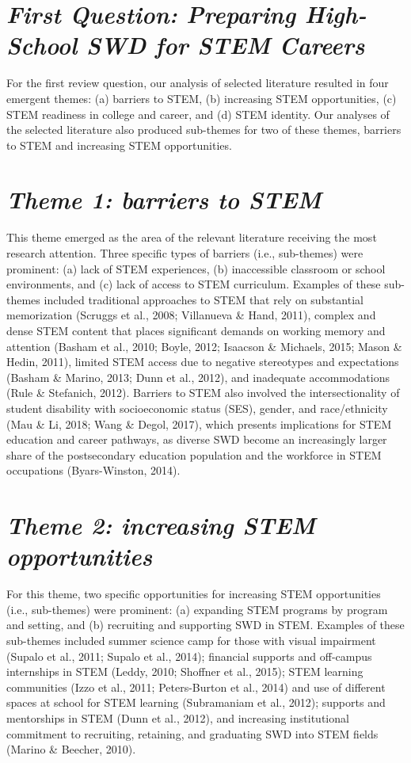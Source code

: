 \documentclass[11pt]{sig-alternate}
\begin{document}
\begin{large}
\section*{\textit{First Question: Preparing High-School SWD for STEM Careers}}
 
For the first review question, our analysis of selected literature resulted in four emergent themes: (a) barriers to STEM, (b) increasing STEM opportunities, (c) STEM readiness in college and career, and (d) STEM identity. Our analyses of the selected literature also produced sub-themes for two of these themes, barriers to STEM and increasing STEM opportunities.   

\section*{\textit{Theme 1: barriers to STEM}}

This theme emerged as the area of the relevant literature receiving the most research attention. Three specific types of barriers (i.e., sub-themes) were prominent: (a) lack of STEM experiences, (b) inaccessible classroom or school environments, and (c) lack of access to STEM curriculum. Examples of these sub-themes included traditional approaches to STEM that rely on substantial memorization (Scruggs et al., 2008; Villanueva \& Hand, 2011), complex and dense STEM content that places significant demands on working memory and attention (Basham et al., 2010; Boyle, 2012; Isaacson \& Michaels, 2015; Mason \& Hedin, 2011), limited STEM access due to negative stereotypes and expectations (Basham \& Marino, 2013; Dunn et al., 2012), and inadequate accommodations (Rule \& Stefanich, 2012). Barriers to STEM also involved the intersectionality of student disability with socioeconomic status (SES), gender, and race/ethnicity (Mau \& Li, 2018; Wang \& Degol, 2017), which presents implications for STEM education and career pathways, as diverse SWD become an increasingly larger share of the postsecondary education population and the workforce in STEM occupations (Byars-Winston, 2014).   

\section*{\textit{Theme 2: increasing STEM opportunities}}

For this theme, two specific opportunities for increasing STEM opportunities (i.e., sub-themes) were prominent: (a) expanding STEM programs by program and setting, and (b) recruiting and supporting SWD in STEM. Examples of these sub-themes included summer science camp for those with visual impairment (Supalo et al., 2011; Supalo et al., 2014); financial supports and off-campus internships in STEM (Leddy, 2010; Shoffner et al., 2015); STEM learning communities (Izzo et al., 2011; Peters-Burton et al., 2014) and use of different spaces at school for STEM learning (Subramaniam et al., 2012); supports and mentorships in STEM (Dunn et al., 2012), and increasing institutional commitment to recruiting, retaining, and graduating SWD into STEM fields (Marino \& Beecher, 2010).


\end{large}
\end{document}
